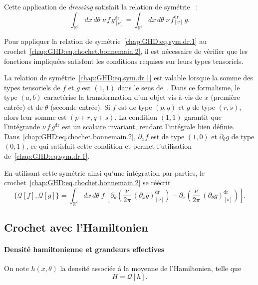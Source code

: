 \medskip

Cette application de \emph{dressing} satisfait la relation de symétrie~\cite{doyon2020lecture} :
\begin{equation}\label{chap:GHD:eq.sym.dr.1}
	\int_{\mathbb{R}^2} dx\, d\theta \; \nu \, f \, g^{\mathrm{dr}}_{[\nu]} 
	= \int_{\mathbb{R}^2} dx\, d\theta \; \nu \, f^{\mathrm{dr}}_{[\nu]} \, g.
\end{equation}

Pour appliquer la relation de symétrie~\eqref{chap:GHD:eq.sym.dr.1} au crochet~\eqref{chap:GHD:eq.chochet.bonnemain.2}, il est nécessaire de vérifier que les fonctions impliquées satisfont les conditions requises sur leurs types tensoriels.

La relation de symétrie~\eqref{chap:GHD:eq.sym.dr.1} est valable lorsque la somme des types tensoriels de $f$ et $g$ est $(1,1)$ dans le sens de~\cite{doyon2020lecture}. Dans ce formalisme, le type $(a,b)$ caractérise la transformation d'un objet vis-à-vis de $x$ (première entrée) et de $\theta$ (seconde entrée). Si $f$ est de type $(p,q)$ et $g$ de type $(r,s)$, alors leur somme est $(p+r,q+s)$. La condition $(1,1)$ garantit que l'intégrande $\nu\, f\, g^{\mathrm{dr}}$ est un scalaire invariant, rendant l'intégrale bien définie. Dans~\eqref{chap:GHD:eq.chochet.bonnemain.2}, $\partial_x f$ est de type $(1,0)$ et $\partial_\theta g$ de type $(0,1)$, ce qui satisfait cette condition et permet l'utilisation de~\eqref{chap:GHD:eq.sym.dr.1}.

En utilisant cette symétrie ainsi qu’une intégration par parties, le crochet~\eqref{chap:GHD:eq.chochet.bonnemain.2} se réécrit
\begin{equation}\label{chap:GHD:eq.chochet.bonnemain.3}
	\{\mathcal{Q}[f], \mathcal{Q}[g]\}
	= \int_{\mathbb{R}^2} dx\, d\theta \; f \,
	\left[
		\partial_\theta \left( \frac{\nu}{2\pi} \, (\partial_x g)^{\mathrm{dr}}_{[\nu]} \right)
		- \partial_x \left( \frac{\nu}{2\pi} \, (\partial_\theta g)^{\mathrm{dr}}_{[\nu]} \right)
	\right].
\end{equation}

\medskip

\subsection{Crochet avec l’Hamiltonien}

\paragraph{Densité hamiltonienne et grandeurs effectives} 
On note $h(x,\theta)$ la densité associée à la moyenne de l’Hamiltonien, telle que
\begin{equation}\label{chap:GHD:eq.ham.1}
	H = \mathcal{Q}[h].
\end{equation}

